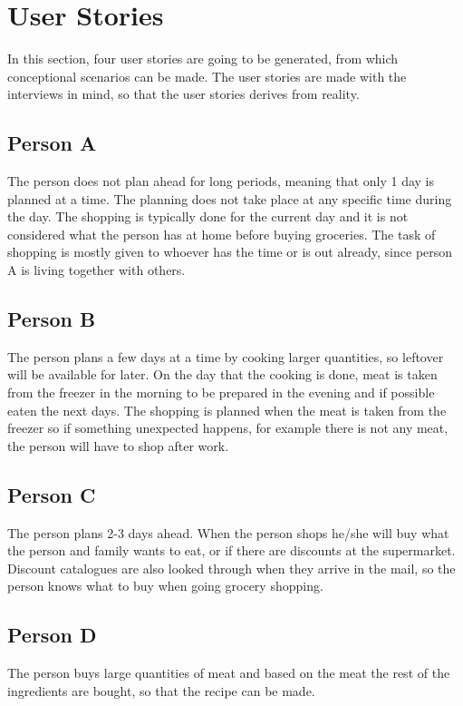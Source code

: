 \section{User Stories} \label{UserStories}

In this section, four user stories are going to be generated, from which conceptional scenarios can be made. The user stories are made with the interviews in mind, so that the user stories derives from reality.

\subsection{Person A}
The person does not plan ahead for long periods, meaning that only 1 day is planned at a time. The planning does not take place at any specific time during the day. The shopping is typically done for the current day and it is not considered what the person has at home before buying groceries. The task of shopping is mostly given to whoever has the time or is out already, since person A is living together with others.

\subsection{Person B}
The person plans a few days at a time by cooking larger quantities, so leftover will be available for later. On the day that the cooking is done, meat is taken from the freezer in the morning to be prepared in the evening and if possible eaten the next days. The shopping is planned when the meat is taken from the freezer so if something unexpected happens, for example there is not any meat, the person will have to shop after work.  
 
\subsection{Person C}
The person plans 2-3 days ahead. When the person shops he/she will buy what the person and family wants to eat, or if there are discounts at the supermarket. Discount catalogues are also looked through when they arrive in the mail, so the person knows what to buy when going grocery shopping.

\subsection{Person D}
The person buys large quantities of meat and based on the meat the rest of the ingredients are bought, so that the recipe can be made.
